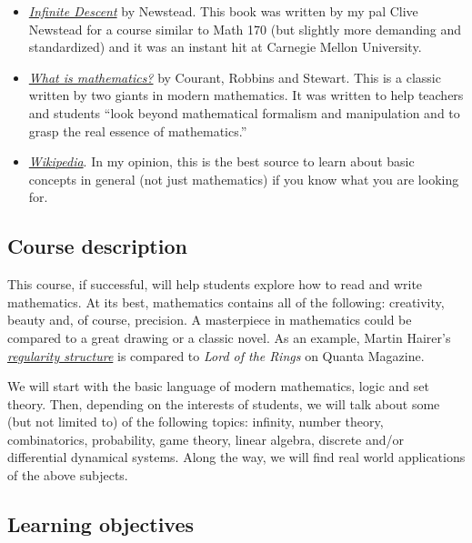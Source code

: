 \documentclass[
]{article}
\begin{document}
\begin{itemize}
\item
  \href{https://infinitedescent.xyz/}{\emph{Infinite Descent}} by Newstead. This book was written
  by my pal Clive Newstead for a course similar to Math 170 (but slightly more demanding and standardized) and it was an instant hit at Carnegie Mellon University.
\item
  \href{https://www.amazon.com/Mathematics-Elementary-Approach-Ideas-Methods/dp/0195105192}{\emph{What is mathematics?}} by Courant, Robbins and Stewart. This is a classic written
  by two giants in modern mathematics.
  It was written to help teachers and students ``look beyond mathematical formalism and manipulation and to grasp
  the real essence of mathematics.''
\item
  \href{https://en.wikipedia.org}{\emph{Wikipedia}}. In my opinion, this is the best source
  to learn about basic concepts in general (not just mathematics) if you know what
  you are looking for.
\end{itemize}

\hypertarget{course-description}{%
\subsection*{Course description}\label{course-description}}

This course, if successful, will help students explore how to read and write mathematics.
At its best, mathematics contains all of the following: creativity, beauty and, of course, precision.
A masterpiece in mathematics could be compared to a great drawing or a classic novel.
As an example, Martin Hairer's \href{https://www.quantamagazine.org/hearing-music-in-noise-martin-hairer-wins-the-fields-medal-20140812}{\emph{regularity structure}} is compared to \emph{Lord of the Rings}
on Quanta Magazine.

We will start with the basic language of modern mathematics, logic and set theory.
Then, depending on the interests of students, we will talk about some (but not limited to) of the following topics: infinity, number theory, combinatorics, probability, game theory,
linear algebra, discrete and/or differential dynamical systems.
Along the way, we will find real world applications of the above subjects.

\hypertarget{learning-objectives}{%
\subsection*{Learning objectives}\label{learning-objectives}}
\end{document}
